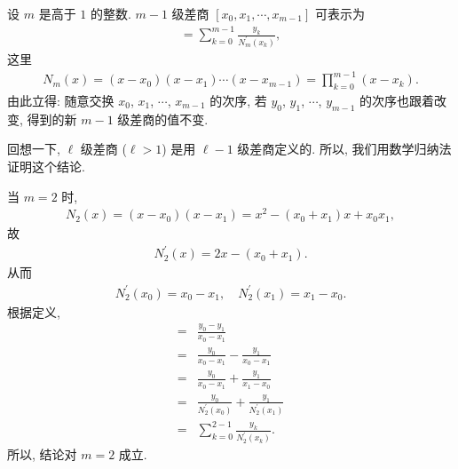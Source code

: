 \begin{proposition}
    设 $m$ 是高于 $1$ 的整数. $m - 1$ 级差商 $[x_0, x_1, \cdots, x_{m-1}]$ 可表示为
    \begin{align*}
        [x_0, x_1, \cdots, x_{m-1}] = \sum_{k = 0}^{m-1} \frac{y_k}{N_m^{\prime} (x_k)},
    \end{align*}
    这里
    \begin{align*}
        N_m (x) = (x - x_0)(x - x_1) \cdots (x - x_{m-1}) = \prod_{k=0}^{m-1} (x - x_k).
    \end{align*}
    由此立得: 随意交换 $x_0$, $x_1$, $\cdots$, $x_{m-1}$ 的次序, 若 $y_0$, $y_1$, $\cdots$, $y_{m-1}$ 的次序也跟着改变, 得到的新 $m - 1$ 级差商的值不变.
\end{proposition}

\begin{pf}
    回想一下, $\ell$ 级差商 ($\ell > 1$) 是用 $\ell - 1$ 级差商定义的. 所以, 我们用数学归纳法证明这个结论.

    当 $m = 2$ 时,
    \begin{align*}
        N_2 (x) = (x - x_0) (x - x_1) = x^2 - (x_0 + x_1) x + x_0 x_1,
    \end{align*}
    故
    \begin{align*}
        N_2^{\prime} (x) = 2x - (x_0 + x_1).
    \end{align*}
    从而
    \begin{align*}
        N_2^{\prime} (x_0) = x_0 - x_1, \quad N_2^{\prime} (x_1) = x_1 - x_0.
    \end{align*}
    根据定义,
    \begin{align*}
        [x_0, x_1]
        = {} & \frac{y_0 - y_1}{x_0 - x_1}                                     \\
        = {} & \frac{y_0}{x_0 - x_1} - \frac{y_1}{x_0 - x_1}                   \\
        = {} & \frac{y_0}{x_0 - x_1} + \frac{y_1}{x_1 - x_0}                   \\
        = {} & \frac{y_0}{N_2^{\prime} (x_0)} + \frac{y_1}{N_2^{\prime} (x_1)} \\
        = {} & \sum_{k = 0}^{2-1} \frac{y_k}{N_2^{\prime} (x_k)}.
    \end{align*}
    所以, 结论对 $m = 2$ 成立.


\end{pf}
